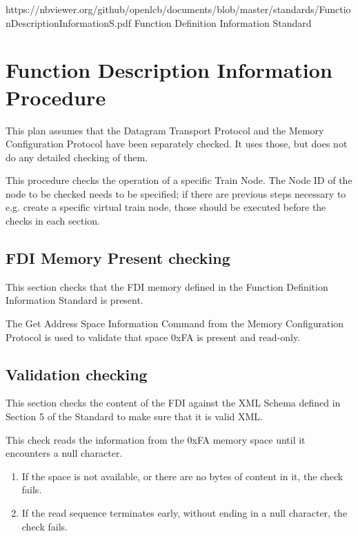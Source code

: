 



\maketitle
\thispagestyle{firststyle}

\introductionCaveats
    {https://nbviewer.org/github/openlcb/documents/blob/master/standards/FunctionDescriptionInformationS.pdf}
    {Function Definition Information Standard}

\section{Function Description Information Procedure}


This plan assumes that the Datagram Transport Protocol and the Memory Configuration Protocol 
have been separately checked. It uses those, but does not do any detailed checking of them.

This procedure checks the operation of a specific Train Node. 
The Node ID of the node to be checked needs to be specified; 
if there are previous steps necessary to e.g. create a specific 
virtual train node, those should be executed before the checks in each section.

\subsection{FDI Memory Present checking}

This section checks that the FDI memory defined in the Function 
Definition Information Standard is present.

The Get Address Space Information Command from the Memory Configuration Protocol
is used to validate that space 0xFA is present and read-only.

\subsection{Validation checking}

This section checks the content of the FDI against the XML Schema 
defined in Section 5 of the Standard to make sure that it is valid XML. 

This check reads the information from the 0xFA memory space
until it encounters a null character.
\begin{enumerate}
\item If the space is not available, or there are no bytes of content in it, the check fails.
\item If the read sequence terminates early, without ending in a null character, the check fails.
\end{enumerate}
 
